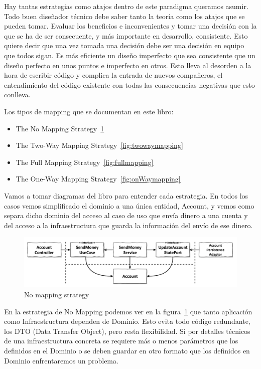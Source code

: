 Hay tantas estrategias como atajos dentro de este paradigma queramos asumir. Todo buen diseñador técnico debe saber tanto la teoría como los atajos que se pueden tomar. Evaluar los beneficios e inconvenientes y tomar una decisión con la que se ha de ser consecuente, y más importante en desarrollo, consistente. Esto quiere decir que una vez tomada una decisión debe ser una decisión en equipo que todos sigan. Es más eficiente un diseño imperfecto que sea consistente que un diseño perfecto en unos puntos e imperfecto en otros. Esto lleva al desorden a la hora de escribir código y complica la entrada de nuevos compañeros, el entendimiento del código existente con todas las consecuencias negativas que esto conlleva.

Los tipos de mapping que se documentan en este libro\cite{TomHombergs2019GYHD}:
\begin{itemize}
    \item The No Mapping Strategy~\cref{fig:nomapping}
    \item The Two-Way Mapping Strategy~\cref{fig:twowaymapping}
    \item The Full Mapping Strategy~\cref{fig:fullmapping}
    \item The One-Way Mapping Strategy~\cref{fig:onWaymapping}
\end{itemize}

Vamos a tomar diagramas del libro para entender cada estrategia. En todos los casos vemos simplificado el dominio a una única entidad, Account, y vemos como separa dicho dominio del acceso al caso de uso que envía dinero a una cuenta y del acceso a la infraestructura que guarda la información del envío de ese dinero.

\begin{figure}[H]
    \centering
    \includegraphics[height=0.1\textheight]{./part/Ejecucion/Seguimiento/CreateTaskUseCase/img/nomapping}
    \caption{No mapping strategy~\cite{TomHombergs2019GYHD}}\label{fig:nomapping}
\end{figure}

En la estrategia de No Mapping podemos ver en la figura~\cref{fig:nomapping} que tanto aplicación como Infraestructura dependen de Dominio. Esto evita todo código redundante, los \gls{DTO} (Data Transfer Object), pero resta flexibilidad. Si por detalles técnicos de una infraestructura concreta se requiere más o menos parámetros que los definidos en el Dominio o se deben guardar en otro formato que los definidos en Dominio enfrentaremos un problema.

